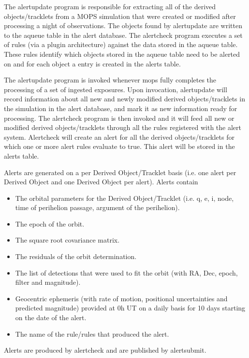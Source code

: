 \documentclass[panstarrs]{panstarrs}
\begin{document}
The alertupdate program is responsible for extracting all of the derived objects/tracklets from a MOPS simulation that were created or modified after processing a night of observations. The objects found by alertupdate are written to the aqueue table in the alert database. The alertcheck program executes a set of rules (via a plugin architecture) against the data stored in the aqueue table. These rules identify which objects stored in the aqueue table need to be alerted on and for each object a entry is created in the alerts table.

The alertupdate program is invoked whenever mops fully completes the processing of a set of ingested exposures. Upon invocation, alertupdate will record information about all new and newly modified derived objects/tracklets in the simulation in the alert database, and mark it as new information ready for processing. The alertcheck program is then invoked and it will feed all new or modified derived objects/tracklets through all the rules registered with the alert system. Alertcheck will create an alert for all the derived objects/tracklets for which one or more alert rules evaluate to true. This alert will be stored in the alerts table. 

Alerts are generated on a per Derived Object/Tracklet basis (i.e. one alert per Derived Object and one Derived Object per alert). Alerts contain
\begin{itemize}
\item The orbital parameters for the Derived Object/Tracklet (i.e. q, e, i, node, time of perihelion passage, argument of the perihelion).
\item The epoch of the orbit.
\item The square root covariance matrix.
\item The residuals of the orbit determination.
\item The list of detections that were used to fit the orbit (with RA, Dec, epoch, filter and magnitude).
\item Geocentric ephemeris (with rate of motion, positional uncertainties and predicted magnitude) provided at 0h UT on a daily basis for 10 days starting on the date of the alert.
\item The name of the rule/rules that produced the alert.
\end{itemize}
Alerts are produced by alertcheck and are published by alertsubmit.
\end{document}
